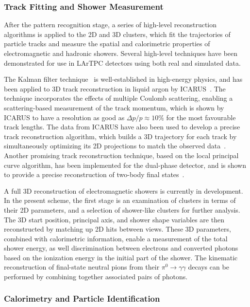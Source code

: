 \subsubsection{Track Fitting and Shower Measurement}

After the pattern recognition stage, a series of high-level reconstruction
algorithms is applied to the 2D and 3D clusters,
which fit the trajectories of particle tracks and measure the
spatial and calorimetric properties of electromagnetic and hadronic showers.
Several high-level techniques have been demonstrated 
for use in LArTPC detectors using both real and simulated data.

The Kalman filter technique~\cite{kalman} is well-established in high-energy physics,
and has been applied to 3D track reconstruction in liquid argon by ICARUS~\cite{Ankowski:2006ts}.
The technique incorporates the effects of multiple Coulomb scattering,
enabling a scattering-based measurement of the track momentum,
which is shown by ICARUS to have a resolution as good as $\Delta p/p \approx 10\%$ 
for the most favourable track lengths.
The data from ICARUS have also been used to develop a precise
track reconstruction algorithm, which builds a 3D trajectory for each track by simultaneously
optimizing its 2D projections to match the observed data~\cite{Antonello:2012hu}.
Another promising track reconstruction technique, based on the local principal curve algorithm,
has been implemented for the dual-phase detector, and is shown to provide 
a precise reconstruction of two-body final states~\cite{Back:2013cva,LAGUNA-LBNO-deliv}. 

A full 3D reconstruction of electromagnetic showers is currently in development.
In the present scheme, the first stage is an examination of clusters 
in terms of their 2D parameters, and a selection of shower-like clusters 
for further analysis. The 3D start position, principal axis,
and shower shape variables are then reconstructed by matching up 2D hits between views.
These 3D parameters, combined with calorimetric information, enable a measurement
of the total shower energy, as well discrimination between electrons
and converted photons based on the ionization energy in the initial part of
the shower. The kinematic reconstruction of final-state neutral pions from their
$\pi^{0} \rightarrow \gamma\gamma$ decays can be performed by 
combining together associated pairs of photons.


\subsubsection{Calorimetry and Particle Identification}

